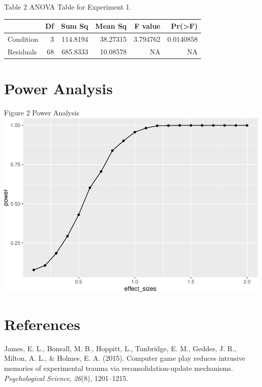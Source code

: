 \documentclass[man]{apa6}
\begin{document}
Table 2 ANOVA Table for Experiment 1.

\begin{tabular}{l|r|r|r|r|r}
\hline
  & Df & Sum Sq & Mean Sq & F value & Pr(>F)\\
\hline
Condition & 3 & 114.8194 & 38.27315 & 3.794762 & 0.0140858\\
\hline
Residuals & 68 & 685.8333 & 10.08578 & NA & NA\\
\hline
\end{tabular}

\newpage 

\section{Power Analysis}\label{power-analysis}

Figure 2 Power Analysis
\includegraphics{testMidterm_files/figure-latex/unnamed-chunk-5-1.pdf}

\newpage

\section{References}\label{references}

\begingroup
\setlength{\parindent}{-0.5in} \setlength{\leftskip}{0.5in}

\hypertarget{refs}{}
\hypertarget{ref-james2015computer}{}
James, E. L., Bonsall, M. B., Hoppitt, L., Tunbridge, E. M., Geddes, J.
R., Milton, A. L., \& Holmes, E. A. (2015). Computer game play reduces
intrusive memories of experimental trauma via reconsolidation-update
mechanisms. \emph{Psychological Science}, \emph{26}(8), 1201--1215.

\endgroup
\end{document}
